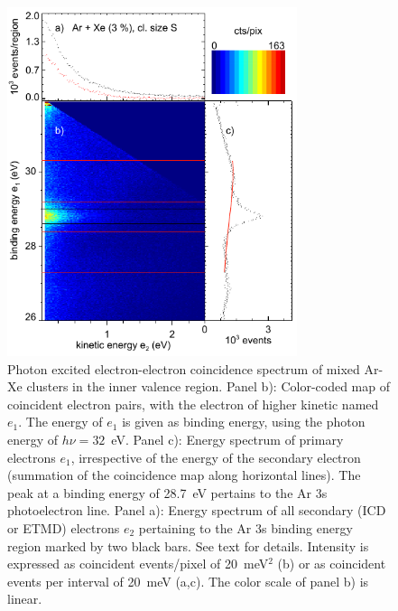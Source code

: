 \begin{figure}[ht]
 \centering
 \includegraphics[width=8.5cm]{pics/figure_map.pdf}
 \caption{
Photon excited electron-electron coincidence spectrum of mixed Ar-Xe clusters in the inner valence region. Panel b): Color-coded map of coincident electron pairs, with the electron of higher kinetic named $e_1$. The energy of $e_1$ is given as binding energy, using the photon energy of $h\nu = 32$~eV. Panel c): Energy spectrum of primary electrons $e_1$, irrespective of the energy of the secondary electron (summation of the coincidence map along horizontal lines). The peak at a binding energy of 28.7~eV pertains to the Ar 3s photoelectron line.  Panel a): Energy spectrum of all secondary (ICD or ETMD) electrons $e_2$ pertaining to the Ar 3s binding energy region marked by two black bars. See text for details. Intensity is expressed as coincident events/pixel of 20~meV$^2$ (b) or as coincident events per interval of 20~meV (a,c). The color scale of panel b) is linear.
}
 \label{figure:map}
\end{figure}



